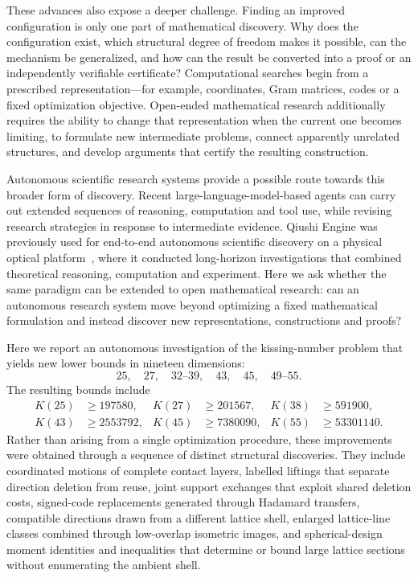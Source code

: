These advances also expose a deeper challenge. Finding an improved
configuration is only one part of mathematical discovery. Why does the
configuration exist, which structural degree of freedom makes it possible,
can the mechanism be generalized, and how can the result be converted into
a proof or an independently verifiable certificate? Computational
searches begin from a prescribed representation---for example,
coordinates, Gram matrices, codes or a fixed optimization objective.
Open-ended mathematical research additionally requires the ability to
change that representation when the current one becomes limiting, to
formulate new intermediate problems, connect apparently unrelated
structures, and develop arguments that certify the resulting
construction.

Autonomous scientific research systems provide a possible route towards
this broader form of discovery. Recent large-language-model-based agents
can carry out extended sequences of reasoning, computation and tool use,
while revising research strategies in response to intermediate evidence.
Qiushi Engine was previously used for end-to-end autonomous scientific
discovery on a physical optical platform~\cite{qiushi-optics}, where it
conducted long-horizon investigations that combined theoretical
reasoning, computation and experiment. Here we ask whether the same
paradigm can be extended to open mathematical research: can an autonomous
research system move beyond optimizing a fixed mathematical formulation
and instead discover new representations, constructions and proofs?

Here we report an autonomous investigation of the kissing-number problem
that yields new lower bounds in nineteen dimensions:
\[
25,\quad27,\quad32\text{--}39,\quad43,\quad45,\quad49\text{--}55.
\]
The resulting bounds include
\[
\begin{aligned}
K(25)&\ge197580,&K(27)&\ge201567,&K(38)&\ge591900,\\
K(43)&\ge2553792,&K(45)&\ge7380090,&K(55)&\ge53301140.
\end{aligned}
\]
Rather than arising from a single optimization procedure, these
improvements were obtained through a sequence of distinct structural
discoveries. They include coordinated motions of complete contact layers,
labelled liftings that separate direction deletion from reuse, joint
support exchanges that exploit shared deletion costs, signed-code
replacements generated through Hadamard transfers, compatible directions
drawn from a different lattice shell, enlarged lattice-line classes
combined through low-overlap isometric images, and spherical-design
moment identities and inequalities that determine or bound large lattice
sections without enumerating the ambient shell.

